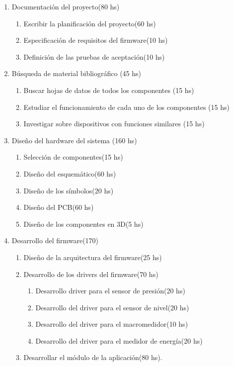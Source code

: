 \documentclass[
11pt, %
codirector, %
]{charter}
\begin{document}
\begin{enumerate}
\item Documentación del proyecto(80 hs)
	\begin{enumerate}
	\item Escribir la planificación del proyecto(60 hs)
	\item Especificación de requisitos del firmware(10 hs)
	\item Definición de las pruebas de aceptación(10 hs)
	\end{enumerate}
\item Búsqueda de material bibliográfico  (45 hs)
	\begin{enumerate}
	\item Buscar hojas de datos de todos los componentes (15 hs)
	\item Estudiar el funcionamiento de cada uno de los componentes (15 hs)
	\item Investigar sobre dispositivos con funciones similares (15 hs)
	\end{enumerate}
\item Diseño del hardware del sistema (160 hs)
	\begin{enumerate}
	\item Selección de componentes(15 hs)
	\item Diseño del esquemático(60 hs)
	\item Diseño de los símbolos(20 hs)
	\item Diseño del PCB(60 hs)
	\item Diseño de los componentes en 3D(5 hs)
	\end{enumerate}
\item Desarrollo del firmware(170)
	\begin{enumerate}
	\item Diseño de la arquitectura del firmware(25 hs)
	\item Desarrollo de los drivers del firmware(70 hs)
	\begin{enumerate}
		\item Desarrollo driver para el sensor de presión(20 hs)
		\item Desarrollo del driver para el sensor de nivel(20 hs)
		\item Desarrollo del driver para el macromedidor(10 hs)
		\item Desarrollo del driver para el medidor de energía(20 hs)
	\end{enumerate}
	\item Desarrollar el módulo de la aplicación(80 hs).
	\end{enumerate}

\end{enumerate}
\end{document}
